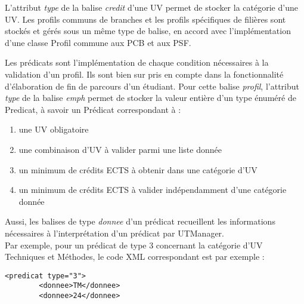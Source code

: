 \documentclass[a4paper,10pt,french]{report}
\begin{document}
	L'attribut \emph{type} de la balise \emph{credit} d'une UV permet de stocker la catégorie d'une UV.
	Les profils communs de branches et les profils spécifiques de filières sont stockés et gérés sous un même type de balise, en accord avec l'implémentation d'une classe Profil commune aux PCB et aux PSF.
	
	Les prédicats sont l'implémentation de chaque condition nécessaires à la validation d'un profil.
	Ils sont bien sur pris en compte dans la fonctionnalité d'élaboration de fin de parcours d'un étudiant.	
	Pour cette balise \emph{profil}, l'attribut \emph{type} de la balise \emph{emph} permet de stocker la valeur entière d'un type énuméré de Predicat, à savoir un Prédicat correspondant à :
	\begin{enumerate}
	\item une UV obligatoire
	\item une combinaison d'UV à valider parmi une liste donnée
	\item un minimum de crédits ECTS à obtenir dans une catégorie d'UV
	\item un minimum de crédits ECTS à valider indépendamment d'une catégorie donnée
	\end{enumerate}
	Aussi, les balises de type \emph{donnee} d'un prédicat recueillent les informations nécessaires à l'interprétation d'un prédicat par UTManager.\\
	Par exemple, pour un prédicat de type 3 concernant la catégorie d'UV Techniques et Méthodes, le code XML correspondant est par exemple :
	\begin{verbatim}
<predicat type="3">
		<donnee>TM</donnee>
		<donnee>24</donnee>
	\end{verbatim}
	
	
	
	
	
		\subsubsection{}
			\paragraph{}
			\paragraph{}
			\paragraph{}
\end{document}
